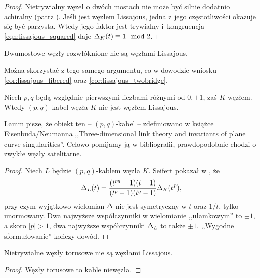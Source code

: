 \begin{proof}
    Nietrywialny węzeł o dwóch mostach nie może być silnie dodatnio achiralny (patrz \cite{hartley79}).
    Jeśli jest węzłem Lissajous, jedna z jego częstotliwości okazuje się być parzysta.
    Wtedy jego faktor jest trywialny i~kongruencja \ref{eqn:lissajous_squared} daje $\Delta_K(t) \equiv 1 \mod 2$.
\end{proof}

\begin{corollary}
%
    Dwumostowe węzły rozwłóknione nie są węzłami Lissajous.
\end{corollary}

Można skorzystać z tego samego argumentu, co w dowodzie wniosku \ref{cor:lissajous_fibered} oraz \ref{cor:lissajous_twobridge}.

\begin{proposition}
    Niech $p, q$ będą względnie pierwszymi liczbami różnymi od $0, \pm 1$, zaś $K$ węzłem.
    Wtedy $(p, q)$-kabel węzła $K$ nie jest węzłem Lissajous.
\end{proposition}

Lamm pisze, że obiekt ten -- $(p, q)$-kabel -- zdefiniowano w książce Eisenbuda/Neumanna ,,Three-dimensional link theory and invariants of plane curve singularities''.
%
%
Celowo pomijamy ją w bibliografii, prawdopodobnie chodzi o zwykłe węzły satelitarne.

\begin{proof}
%
    Niech $L$ będzie $(p, q)$-kablem węzła $K$.
    Seifert pokazał w \cite{seifert50}, że
    \begin{equation}
        \Delta_L(t) = \frac{(t^{pq}-1)(t-1)}{(t^p-1)(t^q-1)} \Delta_K(t^p),
    \end{equation}
    przy czym wyjątkowo wielomian $\Delta$ nie jest symetryczny w $t$ oraz $1/t$, tylko unormowany.
    Dwa najwyższe współczynniki w wielomianie ,,ułamkowym'' to $\pm 1$, a skoro $|p| > 1$, dwa najwyższe współczynniki $\Delta_L$ to także $\pm 1$.
    ,,Wygodne sformułowanie'' kończy dowód.
\end{proof}

\begin{corollary}
%
    Nietrywialne węzły torusowe nie są węzłami Lissajous.
\end{corollary}

\begin{proof}
    Węzły torusowe to kable niewęzła.
\end{proof}


